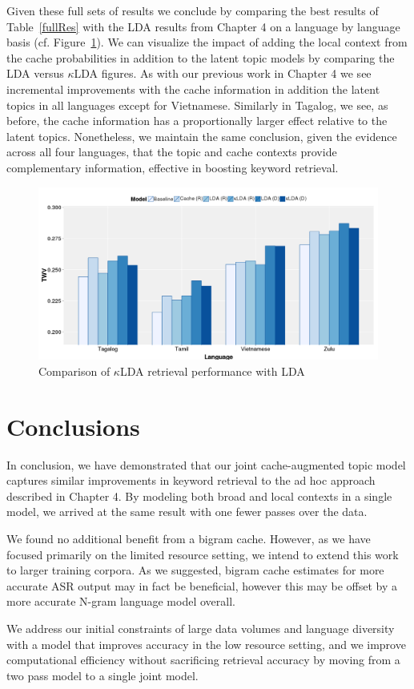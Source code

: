 Given these full sets of results we conclude by comparing the best results of Table~\ref{fullRes} with the LDA results from Chapter 4 on a language by language basis (cf. Figure~\ref{fig7:ldaklda}).  We can visualize the impact of adding the local context from the cache probabilities in addition to the latent topic models by comparing the LDA versus $\kappa$LDA figures.  As with our previous work in Chapter 4 we see incremental improvements with the cache information in addition the latent topics in all languages except for Vietnamese.  Similarly in Tagalog, we see, as before, the cache information has a proportionally larger effect relative to the latent topics.  Nonetheless, we maintain the same conclusion, given the evidence across all four languages, that the topic and cache contexts provide complementary information, effective in boosting keyword retrieval.

\begin{figure}
\centering
\includegraphics[width=\textwidth]{graphs/ch7/compare.png}
\caption[Comparison of $\kappa$LDA with LDA]{Comparison of $\kappa$LDA retrieval performance with LDA \label{fig7:ldaklda}}
\end{figure}

\section{Conclusions}

In conclusion, we have demonstrated that our joint cache-augmented topic model captures similar improvements in keyword retrieval to the ad hoc approach described in Chapter 4.  By modeling both broad and local contexts in a single model, we arrived at the same result with one fewer passes over the data.  

We found no additional benefit from a bigram cache.  However, as we have focused primarily on the limited resource setting, we intend to extend this work to larger training corpora.  As we suggested, bigram cache estimates for more accurate ASR output may in fact be beneficial,  however this may be offset by a more accurate N-gram language model overall.

We address our initial constraints of large data volumes and language diversity with a model that improves accuracy in the low resource setting, and we improve computational efficiency without sacrificing retrieval accuracy by moving from a two pass model to a single joint model.
